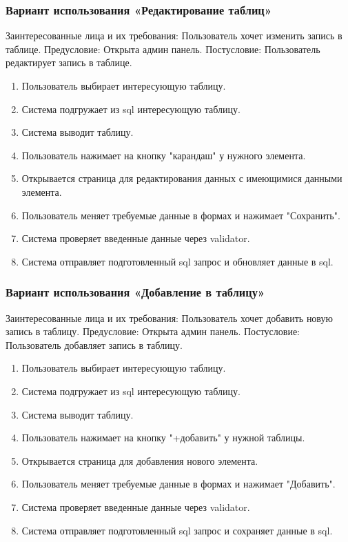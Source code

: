 \subsubsection{Вариант использования «Редактирование таблиц»}
Заинтересованные лица и их требования: Пользователь хочет изменить запись в таблице.
Предусловие: Открыта админ панель.
Постусловие: Пользователь редактирует запись в таблице.
\begin{enumerate}
	\item Пользователь выбирает интересующую таблицу.
	\item Система подгружает из sql интересующую таблицу.
	\item Система выводит таблицу.
	\item Пользователь нажимает на кнопку "карандаш" у нужного элемента.
	\item Открывается страница для редактирования данных с имеющимися данными элемента.
	\item Пользователь меняет требуемые данные в формах и нажимает "Сохранить".
	\item Система проверяет введенные данные через validator.
	\item Система отправляет подготовленный sql запрос и обновляет данные в sql.
\end{enumerate}

\subsubsection{Вариант использования «Добавление в таблицу»}
Заинтересованные лица и их требования: Пользователь хочет добавить новую запись в таблицу.
Предусловие: Открыта админ панель.
Постусловие: Пользователь добавляет запись в таблицу.
\begin{enumerate}
	\item Пользователь выбирает интересующую таблицу.
	\item Система подгружает из sql интересующую таблицу.
	\item Система выводит таблицу.
	\item Пользователь нажимает на кнопку "+добавить" у нужной таблицы.
	\item Открывается страница для добавления нового элемента.
	\item Пользователь меняет требуемые данные в формах и нажимает "Добавить".
	\item Система проверяет введенные данные через validator.
	\item Система отправляет подготовленный sql запрос и сохраняет данные в sql.
\end{enumerate}

